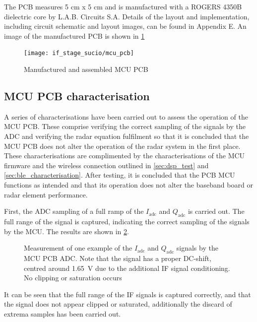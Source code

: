 The PCB measures 5 cm x 5 cm and is manufactured with a ROGERS 4350B dielectric core by L.A.B. Circuits S.A. Details of the layout and implementation, including circuit schematic and layout images, can be found in Appendix E. %
An image of the manufactured PCB is shown in \cref{fig:mcu_pcb}

\begin{figure}[h]
	\centering
	\texttt{[image: if\_stage\_sucio/mcu\_pcb]}
	\caption{Manufactured and assembled MCU PCB}
	\label{fig:mcu_pcb}
\end{figure}

\subsection{MCU PCB characterisation}

A series of characterisations have been carried out to assess the operation of the MCU PCB. These comprise verifying the correct sampling of the signals by the ADC and verifying the radar equation fulfilment so that it is concluded that the MCU PCB does not alter the operation of the radar system in the first place. These characterisations are complimented by the characterisations of the MCU firmware and the wireless connection outlined in \cref{sec:dsp_test} and \cref{sec:ble_characterisation}.
After testing, it is concluded that the PCB MCU functions as intended and that its operation does not alter the baseband board or radar element performance.

First, the ADC sampling of a full ramp of the $I_\mathrm{adc}$ and $Q_\mathrm{adc}$ is carried out. The full range of the signal is captured, indicating the correct sampling of the signals by the MCU. The results are shown in \cref{fig:mcu_test_adc}.

\begin{figure}[htb]
	\centering
	
	\caption{Measurement of one example of the  $I_\mathrm{adc}$ and $Q_\mathrm{adc}$ signals by the MCU PCB ADC. Note that the signal has a proper DC-shift, centred around \SI{1.65}{\volt} due to the additional IF signal conditioning. No clipping or saturation occurs} %
	\label{fig:mcu_test_adc}
\end{figure}

It can be seen that the full range of the IF signals is captured correctly, and that the signal does not appear clipped or saturated, additionally the discard of extrema samples has been carried out.

